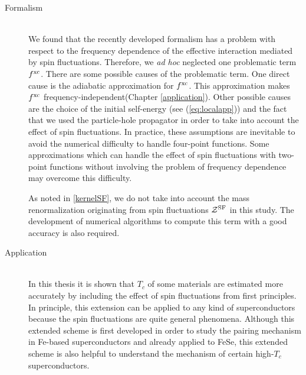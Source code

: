 \begin{description}
	\item[Formalism] \mbox{}\\
We found that the recently developed formalism has a problem with respect to the frequency dependence
of the effective interaction mediated by spin fluctuations. Therefore, we {\it ad hoc} neglected
one problematic term $f^{\rm xc}$. 
There are some possible causes of the problematic term. One direct cause is the adiabatic 
approximation for $f^{\rm xc}$. This approximation makes $f^{\rm xc}$ frequency-independent(Chapter 
\ref{application}).
Other possible causes are the choice of the initial self-energy (see (\ref{eq:localapp})) and 
the fact that we used the particle-hole propagator in order to take into account the effect of
spin fluctuations. In practice, these assumptions are inevitable to avoid the numerical difficulty 
to handle four-point functions. Some approximations which can handle the effect of spin 
fluctuations with two-point functions without involving the problem of frequency dependence may 
overcome this difficulty.

As noted in \ref{kernelSF}, we do not take into account the mass renormalization 
originating from spin fluctuations $\mathcal Z^{\rm SF}$ in this study.
The development of numerical algorithms to compute this term with a good accuracy is also required.

\item[Application] \mbox{}\\
	In this thesis it is shown that $T_c$ of some materials are estimated more accurately by 
	including the effect of spin fluctuations from first principles. 
	In principle, this extension can be applied to any 
	kind of superconductors because the spin fluctuations are quite general phenomena.
	Although this extended scheme is first developed in order to study the pairing mechanism in 
	Fe-based superconductors and already applied to FeSe\cite{Essenberger2016},
	this extended scheme is also helpful to understand the mechanism of certain 
	high-$T_c$ superconductors.


\end{description}



